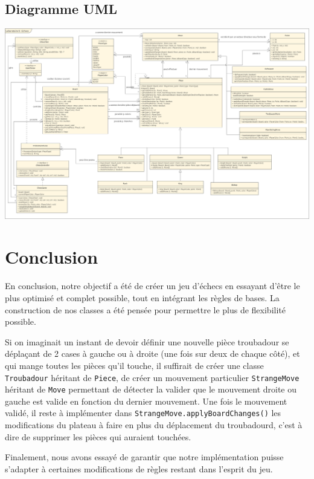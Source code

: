 \documentclass[12pt]{article}
\begin{document}
\begin{landscape}
\thispagestyle{empty}
\newpage
\section{Diagramme UML}
\includegraphics[width=25cm]{uml.png}
\newpage
\end{landscape}

\section{Conclusion}

En conclusion, notre objectif a été de créer un jeu d'échecs en essayant d'être le plus optimisé et complet possible, tout en intégrant les règles de bases. La construction de nos classes a été pensée pour permettre le plus de flexibilité possible. 

Si on imaginait un instant de devoir définir une nouvelle pièce troubadour se déplaçant de 2 cases à gauche ou à droite (une fois sur deux de chaque côté), et qui mange toutes les pièces qu'il touche, il suffirait de créer une classe \texttt{Troubadour} héritant de \texttt{Piece}, de créer un mouvement particulier \texttt{StrangeMove} héritant de \texttt{Move} permettant de détecter la valider que le mouvement droite ou gauche est valide en fonction du dernier mouvement. Une fois le mouvement validé, il reste à implémenter dans \texttt{StrangeMove.applyBoardChanges()} les modifications du plateau à faire en plus du déplacement du troubadourd, c'est à dire de supprimer les pièces qui auraient touchées.

Finalement, nous avons essayé de garantir que notre implémentation puisse s'adapter à certaines modifications de règles restant dans l'esprit du jeu.
\end{document}
